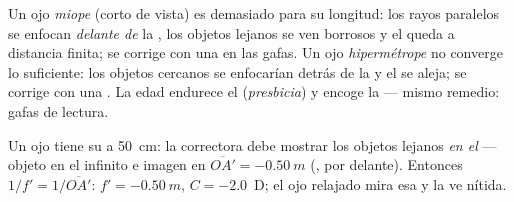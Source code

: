 \begin{definition}\label{def:g11:lenses-and-eye:defects}
Un ojo \emph{miope} (corto de vista) es demasiado
 para su longitud: los rayos paralelos se enfocan
\emph{delante de} la , los objetos lejanos se ven borrosos y el
 queda a distancia finita; se corrige con una  en las gafas. Un ojo \emph{hipermétrope}
no converge lo suficiente: los objetos cercanos se enfocarían detrás de
la  y el  se aleja; se corrige con una . La edad endurece el 
(\emph{presbicia}) y encoge la  --- mismo
remedio: gafas de lectura.
\end{definition}

\begin{example}\label{ex:g11:lenses-and-eye:correction}
Un ojo  tiene su  a \qty{50}{cm}: la  correctora
debe mostrar los objetos lejanos \emph{en el } --- objeto en
el infinito e imagen en $\overline{OA'} = \qty{-0.50}{m}$ (, por
delante). Entonces $1/f' = 1/\overline{OA'}$: $f' = \qty{-0.50}{m}$,
$C = -2.0$~D; el ojo relajado mira esa  y la ve nítida.
\end{example}

